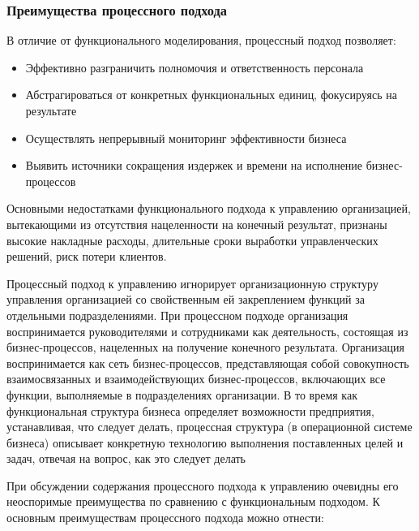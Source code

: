 \documentclass{../industrial-development}
\begin{document}



\begin{frame} \frametitle{Преимущества процессного подхода}
	В отличие от функционального моделирования, процессный подход позволяет:
	\begin{itemize}
		\item Эффективно разграничить полномочия и ответственность персонала
		\item Абстрагироваться от  конкретных функциональных единиц, фокусируясь на результате
		\item Осуществлять непрерывный мониторинг эффективности бизнеса
		\item Выявить источники сокращения издержек и времени на исполнение бизнес-процессов
	\end{itemize}
\end{frame}
\lecturenotes
Основными недостатками функционального подхода к управлению организацией, вытекающими из отсутствия нацеленности на конечный результат, признаны высокие накладные расходы, длительные сроки выработки управленческих решений, риск потери клиентов.

Процессный подход к управлению игнорирует организационную структуру управления организацией со свойственным ей закреплением функций за отдельными подразделениями. При процессном подходе организация воспринимается руководителями и сотрудниками как деятельность, состоящая из бизнес-процессов, нацеленных на получение конечного результата. Организация воспринимается как сеть бизнес-процессов, представляющая собой совокупность взаимосвязанных и взаимодействующих бизнес-процессов, включающих все функции, выполняемые в подразделениях организации. В то время как функциональная структура бизнеса определяет возможности предприятия, устанавливая, что следует делать, процессная структура (в операционной системе бизнеса) описывает конкретную технологию выполнения поставленных целей и задач, отвечая на вопрос, как это следует делать

 

При обсуждении содержания процессного подхода к управлению очевидны его неоспоримые преимущества по сравнению с функциональным подходом. К основным преимуществам процессного подхода можно отнести:
\end{document}

